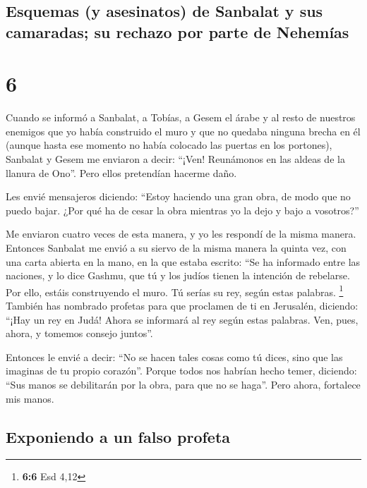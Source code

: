 \hypertarget{esquemas-y-asesinatos-de-sanbalat-y-sus-camaradas-su-rechazo-por-parte-de-nehemuxedas}{%
\subsection{Esquemas (y asesinatos) de Sanbalat y sus camaradas; su
rechazo por parte de
Nehemías}\label{esquemas-y-asesinatos-de-sanbalat-y-sus-camaradas-su-rechazo-por-parte-de-nehemuxedas}}

\hypertarget{section-5}{%
\section{6}\label{section-5}}

 Cuando se informó a Sanbalat, a Tobías, a Gesem el árabe
y al resto de nuestros enemigos que yo había construido el muro y que no
quedaba ninguna brecha en él (aunque hasta ese momento no había colocado
las puertas en los portones),  Sanbalat y Gesem me
enviaron a decir: ``¡Ven! Reunámonos en las aldeas de la llanura de
Ono''. Pero ellos pretendían hacerme daño.

 Les envié mensajeros diciendo: ``Estoy haciendo una gran
obra, de modo que no puedo bajar. ¿Por qué ha de cesar la obra mientras
yo la dejo y bajo a vosotros?''

 Me enviaron cuatro veces de esta manera, y yo les
respondí de la misma manera.  Entonces Sanbalat me envió a
su siervo de la misma manera la quinta vez, con una carta abierta en la
mano,  en la que estaba escrito: ``Se ha informado entre
las naciones, y lo dice Gashmu, que tú y los judíos tienen la intención
de rebelarse. Por ello, estáis construyendo el muro. Tú serías su rey,
según estas palabras. \footnote{\textbf{6:6} Esd 4,12} 
También has nombrado profetas para que proclamen de ti en Jerusalén,
diciendo: ``¡Hay un rey en Judá! Ahora se informará al rey según estas
palabras. Ven, pues, ahora, y tomemos consejo juntos''.

 Entonces le envié a decir: ``No se hacen tales cosas como
tú dices, sino que las imaginas de tu propio corazón''. 
Porque todos nos habrían hecho temer, diciendo: ``Sus manos se
debilitarán por la obra, para que no se haga''. Pero ahora, fortalece
mis manos.

\hypertarget{exponiendo-a-un-falso-profeta}{%
\subsection{Exponiendo a un falso
profeta}\label{exponiendo-a-un-falso-profeta}}

